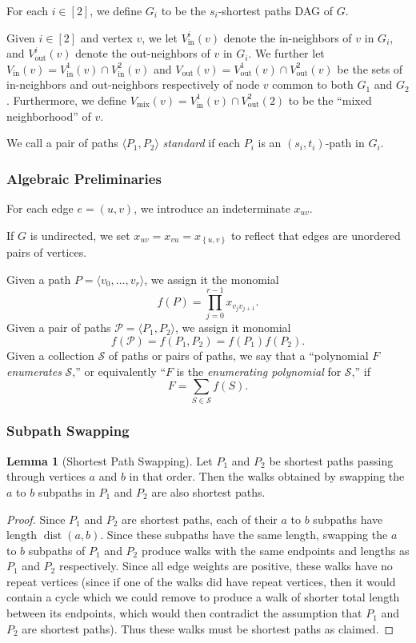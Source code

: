 \documentclass[11pt]{article}
\newcommand{\set}[1]{\left\{#1\right\}}
\DeclareMathOperator{\dist}{dist}
\newcommand{\ca}{\mathcal}
\renewcommand{\t}{\text}
\newcommand{\vin}{V_{\t{in}}}
\newcommand{\vout}{V_{\t{out}}}
\newcommand{\vmix}{V_{\t{mix}}}
\theoremstyle{definition}
\newtheorem{lemma}[theorem]{Lemma}
\begin{document}
For each $i\in [2]$, we define $G_i$ to be the $s_i$-shortest paths DAG of $G$.

Given $i\in [2]$ and vertex $v$, we let $V_{\text{in}}^{i}(v)$ denote the in-neighbors of $v$ in $G_i$, and $\vout^i(v)$ denote the out-neighbors of $v$ in $G_i$.
We further let $\vin(v) = \vin^1(v)\cap \vin^2(v)$ and $\vout(v) = \vout^1(v)\cap \vout^2(v)$ be the sets of in-neighbors and out-neighbors respectively of node $v$ common to both $G_1$ and $G_2$.
Furthermore, we define $\vmix(v) = \vin^1(v)\cap \vout^2(2)$ to be the ``mixed neighborhood'' of $v$. 

We call a pair of paths $\langle P_1,P_2\rangle$ \emph{standard} if each $P_i$ is an $(s_i,t_i)$-path in $G_i$.

\subsubsection*{Algebraic Preliminaries}

For each edge $e = (u,v)$, we introduce an indeterminate $x_{uv}$.

If $G$ is undirected, we set 
$x_{uv} = x_{vu} = x_{\set{u,v}}$
to reflect that edges are unordered pairs of vertices.

\noindent Given a path $P = \langle v_0, \dots, v_r\rangle $, we assign it the monomial
    \[f(P) = \prod_{j=0}^{r-1}x_{v_jv_{j+1}}.\]    
Given a pair of paths $\ca{P} = \langle P_1, P_2\rangle$, we assign it monomial 
    \[f(\ca{P}) = f(P_1,P_2) = f(P_1)f(P_2).\]
Given a collection $\ca{S}$ of paths or pairs of paths, we say that a ``polynomial $F$ \emph{enumerates} $\ca{S}$,'' or equivalently ``$F$ is the \emph{enumerating polynomial} for $\ca{S}$,'' if 
    \[F = \sum_{S\in \ca{S}} f(S).\]

\subsubsection*{Subpath Swapping}

\begin{lemma}[Shortest Path Swapping]
\label{preserve-shortest-paths}
    Let $P_1$ and $P_2$ be shortest paths passing through vertices $a$ and $b$ in that order.
    Then the walks obtained by swapping the $a$ to $b$ subpaths in $P_1$ and $P_2$ are also shortest paths.
\end{lemma}
\begin{proof}
Since $P_1$ and $P_2$ are shortest paths, each of their $a$ to $b$ subpaths have length $\dist(a,b)$.
Since these subpaths have the same length, swapping the $a$ to $b$ subpaths of $P_1$ and $P_2$ produce walks with the same endpoints and lengths as $P_1$ and $P_2$ respectively.
Since all edge weights are positive, these walks have no repeat vertices (since if one of the walks did have repeat vertices, then it would contain a cycle which we could remove to produce a walk of shorter total length between its endpoints, which would then contradict the assumption that $P_1$ and $P_2$ are shortest paths).
Thus these walks must be shortest paths as claimed.
\end{proof}
\end{document}
